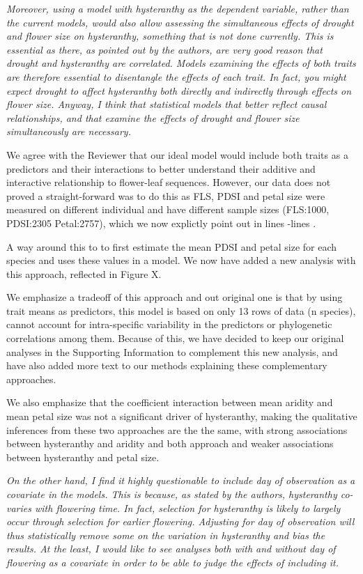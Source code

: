 \documentclass{article}[12pt]
\begin{document}
\emph{Moreover, using a model with hysteranthy as the dependent variable, rather than the current models, would also allow assessing the simultaneous effects of drought and flower size on hysteranthy, something that is not done currently. This is essential as there, as pointed out by the authors, are very good reason that drought and hysteranthy are correlated. Models examining the effects of both traits are therefore essential to disentangle the effects of each trait. In fact, you might expect drought to affect hysteranthy both directly and indirectly through effects on flower size. Anyway, I think that statistical models that better reflect causal relationships, and that examine the effects of drought and flower size simultaneously are necessary.}

We agree with the Reviewer that our ideal model would include both traits as a predictors and their interactions to better understand their additive and interactive relationship to flower-leaf sequences. However, our data does not proved a straight-forward was to do this as FLS, PDSI and petal size were measured on different individual and have different sample sizes (FLS:1000, PDSI:2305 Petal:2757), which we now explictly point out in lines -lines   . 

A way around this to to first estimate the mean PDSI and petal size for each species and uses these values in a model. We now have added a new analysis with this approach, reflected in Figure X.

We emphasize a tradeoff of this approach and out original one is that by using trait means as predictors, this model is based on only 13 rows of data (n species), cannot account for intra-specific variability in the predictors or phylogenetic correlations among them. Because of this, we have decided to keep our original analyses in the Supporting Information to complement this new analysis, and have also added more text to our methods explaining these complementary approaches.

We also emphasize that the coefficient interaction between mean aridity and mean petal size was not a significant driver of hysteranthy, making the qualitative inferences from these two approaches are the the same, with strong associations between hysteranthy and aridity and both approach and weaker associations between hysteranthy and petal size. 


\emph{On the other hand, I find it highly questionable to include day of observation as a covariate in the models. This is because, as stated by the authors, hysteranthy co-varies with flowering time. In fact, selection for hysteranthy is likely to largely occur through selection for earlier flowering. Adjusting for day of observation will thus statistically remove some on the variation in hysteranthy and bias the results. At the least, I would like to see analyses both with and without day of flowering as a covariate in order to be able to judge the effects of including it.}
\end{document}
